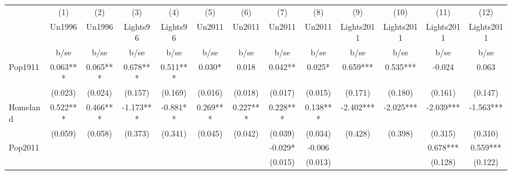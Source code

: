 {
\def\sym#1{\ifmmode^{#1}\else\(^{#1}\)\fi}
\begin{tabular}{l*{12}{c}}
\hline\hline
                    &\multicolumn{1}{c}{(1)}&\multicolumn{1}{c}{(2)}&\multicolumn{1}{c}{(3)}&\multicolumn{1}{c}{(4)}&\multicolumn{1}{c}{(5)}&\multicolumn{1}{c}{(6)}&\multicolumn{1}{c}{(7)}&\multicolumn{1}{c}{(8)}&\multicolumn{1}{c}{(9)}&\multicolumn{1}{c}{(10)}&\multicolumn{1}{c}{(11)}&\multicolumn{1}{c}{(12)}\\
                    &\multicolumn{1}{c}{Un1996}&\multicolumn{1}{c}{Un1996}&\multicolumn{1}{c}{Lights96}&\multicolumn{1}{c}{Lights96}&\multicolumn{1}{c}{Un2011}&\multicolumn{1}{c}{Un2011}&\multicolumn{1}{c}{Un2011}&\multicolumn{1}{c}{Un2011}&\multicolumn{1}{c}{Lights2011}&\multicolumn{1}{c}{Lights2011}&\multicolumn{1}{c}{Lights2011}&\multicolumn{1}{c}{Lights2011}\\
                    &        b/se   &        b/se   &        b/se   &        b/se   &        b/se   &        b/se   &        b/se   &        b/se   &        b/se   &        b/se   &        b/se   &        b/se   \\
\hline
Pop1911             &       0.063***&       0.065***&       0.678***&       0.511***&       0.030*  &       0.018   &       0.042** &       0.025*  &       0.659***&       0.535***&      -0.024   &       0.063   \\
                    &     (0.023)   &     (0.024)   &     (0.157)   &     (0.169)   &     (0.016)   &     (0.018)   &     (0.017)   &     (0.015)   &     (0.171)   &     (0.180)   &     (0.161)   &     (0.147)   \\
Homeland            &       0.522***&       0.466***&      -1.173***&      -0.881** &       0.269***&       0.227***&       0.228***&       0.138***&      -2.402***&      -2.025***&      -2.039***&      -1.563***\\
                    &     (0.059)   &     (0.058)   &     (0.373)   &     (0.341)   &     (0.045)   &     (0.042)   &     (0.039)   &     (0.034)   &     (0.428)   &     (0.398)   &     (0.315)   &     (0.310)   \\
Pop2011             &               &               &               &               &               &               &      -0.029*  &      -0.006   &               &               &       0.678***&       0.559***\\
                    &               &               &               &               &               &               &     (0.015)   &     (0.013)   &               &               &     (0.128)   &     (0.122)   \\

\end{tabular}}
